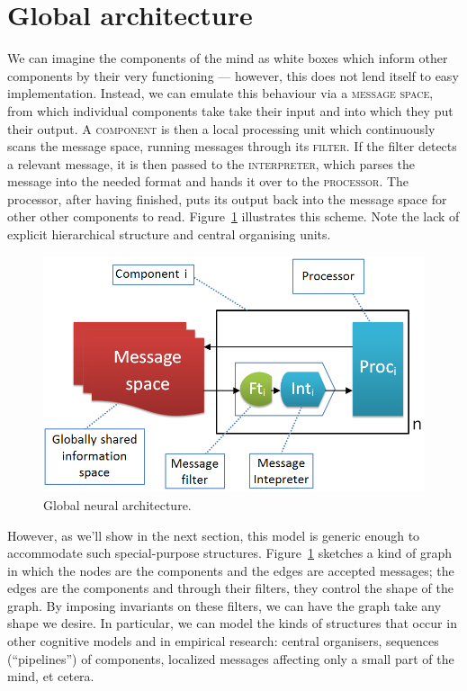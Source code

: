 \documentclass[]{scrartcl}
\newcommand{\caps}[1]{\textsc{#1}}
\begin{document}
\section{Global architecture}\label{sec:globalArchitecture}

We can imagine the components of the mind as white boxes which inform other components by their very functioning --- however, this does not lend itself to easy implementation. Instead, we can emulate this behaviour via a \caps{message space}, from which individual components take take their input and into which they put their output. A \caps{component} is then a local processing unit which continuously scans the message space, running messages through its \caps{filter}. If the filter detects a relevant message, it is then passed to the \caps{interpreter}, which parses the message into the needed format and hands it over to the \caps{processor}. The processor, after having finished, puts its output back into the message space for other other components to read. Figure~\ref{fig:global} illustrates this scheme. Note the lack of explicit hierarchical structure and central organising units.

\begin{figure}
	\centering
	\includegraphics[width=400pt]{figs/global.png}
	\caption{Global neural architecture.}
	\label{fig:global}
\end{figure}

However, as we'll show in the next section, this model is generic enough to accommodate such special-purpose structures. Figure~\ref{fig:global} sketches a kind of graph in which the nodes are the components and the edges are accepted messages; the edges are the components and through their filters, they control the shape of the graph. By imposing invariants on these filters, we can have the graph take any shape we desire. In particular, we can model the kinds of structures that occur in other cognitive models and in empirical research: central organisers, sequences (``pipelines'') of components, localized messages affecting only a small part of the mind, et cetera.
\end{document}
